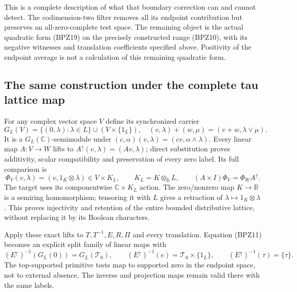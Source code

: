 This is a complete description of what that boundary correction can
and cannot detect. The codimension-two filter removes all its endpoint
contribution but preserves an all-zero-complete test space. The
remaining object is the actual quadratic form (BPZ19) on the precisely
constructed range (BPZ10), with its negative witnesses and translation
coefficients specified above. Positivity of the endpoint average is
not a calculation of this remaining quadratic form.

\subsection{The same construction under the complete tau lattice map}

For any complex vector space $V$ define its synchronized carrier
\[
 G_L(V)=\{(0,\lambda):\lambda\in L\}\cup(V\times\{1_L\}),
 \quad(v,\lambda)+(w,\mu)=(v+w,\lambda\vee\mu).
\]
It is a $G_L(\mathbb C)$-semimodule under
$(c,\alpha)(v,\lambda)=(cv,\alpha\wedge\lambda)$.
Every linear map $A:V\to W$ lifts to
$A^\uparrow(v,\lambda)=(Av,\lambda)$; direct substitution proves
additivity, scalar compatibility and preservation of every zero label.
Its full comparison is
\begin{equation}\tag{BPZ20}
 \Phi_V(v,\lambda)=(v,1_K\otimes\lambda)
       \in V\times K_L,\qquad K_L=K\otimes_{\mathbb B}L,
 \qquad
 (A\times I)\Phi_V=\Phi_W A^\uparrow.
\end{equation}
The target uses its componentwise $\mathbb C\times K_L$ action.
The zero/nonzero map $K\to\mathbb B$ is a semiring homomorphism;
tensoring it with $L$ gives a retraction of
$\lambda\mapsto1_K\otimes\lambda$. This proves injectivity and
retention of the entire bounded distributive lattice, without replacing
it by its Boolean characters.

Apply these exact lifts to $T,T^{-1},E,R,\Pi$ and every translation.
Equation (BPZ11) becomes an explicit split family of linear maps with
\begin{equation}\tag{BPZ21}
 (E^\uparrow)^{-1}(G_L(0))=G_L(\mathcal T_0),\qquad
 (E^\uparrow)^{-1}(e)=\mathcal T_0\times\{1_L\},\qquad
 (E^\uparrow)^{-1}(\tau)=\{\tau\}.
\end{equation}
The top-supported primitive tests map to supported zero in the endpoint
space, not to external absence. The inverse and projection maps remain
valid there with the same labels.


